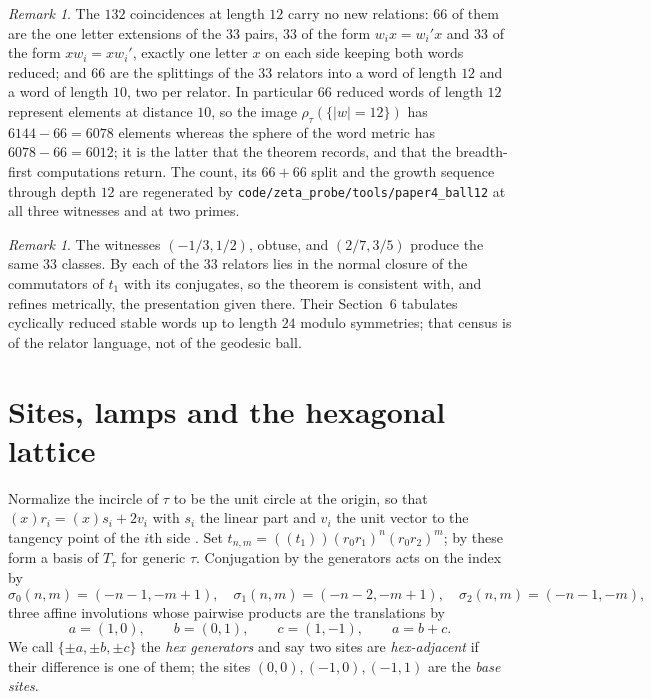 \documentclass[11pt]{article}
\theoremstyle{definition}
\theoremstyle{remark}
\newtheorem{remark}[theorem]{Remark}
\begin{document}
\begin{remark}\label{rem:twelve}
The $132$ coincidences at length $12$ carry no new relations: $66$ of them are
the one letter extensions of the $33$ pairs, $33$ of the form $w_ix=w_i'x$ and
$33$ of the form $xw_i=xw_i'$, exactly one letter $x$ on each side keeping both
words reduced; and $66$ are the splittings of the $33$ relators into a word of
length $12$ and a word of length $10$, two per relator. In particular $66$
reduced words of length $12$ represent elements at distance $10$, so the image
$\rho_\tau(\{|w|=12\})$ has $6144-66=6078$ elements whereas the sphere of the
word metric has $6078-66=6012$; it is the latter that the theorem records, and
that the breadth-first computations return. The count, its $66+66$ split and
the growth sequence through depth $12$ are regenerated by
\texttt{code/zeta\_probe/tools/paper4\_ball12} at all three witnesses and at two
primes.
\end{remark}

\begin{remark}
The witnesses $(-1/3,1/2)$, obtuse, and $(2/7,3/5)$ produce the same $33$
classes. By \cite[Thm.~4.2]{IP} each of the $33$ relators lies in the normal
closure of the commutators of $t_1$ with its conjugates, so the theorem is
consistent with, and refines metrically, the presentation given there. Their
Section~6 tabulates cyclically reduced stable words up to length $24$ modulo
symmetries; that census is of the relator language, not of the geodesic ball.
\end{remark}

\section{Sites, lamps and the hexagonal lattice}\label{sec:sites}

Normalize the incircle of $\tau$ to be the unit circle at the origin, so that
$(x)r_i=(x)s_i+2v_i$ with $s_i$ the linear part and $v_i$ the unit vector to the
tangency point of the $i$th side \cite[\S3]{IP}. Set
$t_{n,m}=(\!(t_1)\!)(r_0r_1)^n(r_0r_2)^m$; by \cite[Thm.~4.1]{IP} these form a
basis of $T_\tau$ for generic $\tau$. Conjugation by the generators acts on the
index by
\[
 \sigma_0(n,m)=(-n-1,-m+1),\quad \sigma_1(n,m)=(-n-2,-m+1),\quad
 \sigma_2(n,m)=(-n-1,-m),
\]
three affine involutions whose pairwise products are the translations by
\[
 a=(1,0),\qquad b=(0,1),\qquad c=(1,-1),\qquad a=b+c.
\]
We call $\{\pm a,\pm b,\pm c\}$ the \emph{hex generators} and say two sites are
\emph{hex-adjacent} if their difference is one of them; the sites
$(0,0),(-1,0),(-1,1)$ are the \emph{base sites}.
\end{document}
